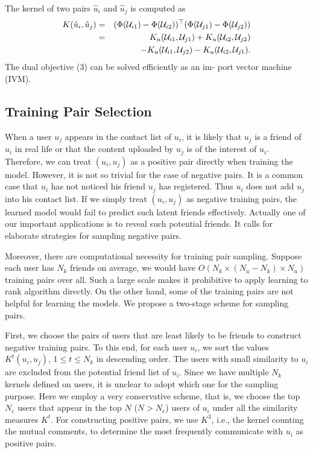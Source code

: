 The kernel of two pairs $\hat{u}_i$ and $\hat{u}_j$ is computed as
\begin{eqnarray}
K(\hat{u}_i, \hat{u}_j) &=& (\Phi({\cal U}_{i1}) - \Phi({\cal U}_{i2}))^\top(\Phi({\cal U}_{j1}) - \Phi({\cal U}_{j2})) \nonumber\\
&=& K_u({\cal U}_{i1}, {\cal U}_{j1}) + K_u({\cal U}_{i2}, {\cal U}_{j2}) \nonumber\\
&& - K_u({\cal U}_{i1}, {\cal U}_{j2}) - K_u({\cal U}_{i2}, {\cal U}_{j1}) \nonumber.
\end{eqnarray}
The dual objective (3) can be solved efficiently as an im-
port vector machine (IVM)\cite{nips/ZhuH01}.

\subsection{Training Pair Selection}

When a user $u_j$ appears in the contact list of $u_i$, it is likely that $u_j$ is a friend of $u_i$ in real life or that the content uploaded by $u_j$ is of
the interest of $u_i$. Therefore, we can treat $(u_i, u_j)$ as a positive pair directly when training the model. However, it is not so trivial for the case of
negative pairs. It is a common case that $u_i$ has not noticed his friend $u_j$ has registered. Thus $u_i$ does not add $u_j$ into his contact list. If we
simply treat $(u_i, u_j)$ as negative training pairs, the learned model would fail to predict such latent friends effectively. Actually one of our important
applications is to reveal such potential friends. It calls for elaborate strategies for sampling negative pairs.

Moreover, there are computational necessity for training pair sampling. Suppose each user has $N_k$ friends on average, we would have $O(N_k\times(N_u -
N_k)\times N_u)$ training pairs over all. Such a large scale makes it prohibitive to apply learning to rank algorithm directly. On the other hand,
some of the training pairs are not helpful for learning the models. We propose a two-stage scheme for sampling pairs.

First, we choose the pairs of users that are least likely to be friends to construct negative training pairs. To this end, for each user $u_i$, we sort the
values $K^t(u_i, u_j)$, $1\leq t \leq N_k$ in descending order. The users with small similarity to $u_i$ are excluded from the potential friend list of $u_i$.
Since we have multiple $N_k$ kernels defined on users, it is unclear to adopt which one for the sampling purpose. Here we employ a very conservative scheme,
that is, we choose the top $N_e$ users that appear in the top $N$ ($N>N_e$) users of $u_i$ under all the similarity measures $K^t$. For constructing positive pairs, we use $K^3$, i.e., the kernel counting the mutual comments, to determine the most frequently communicate with $u_i$ as positive pairs.

